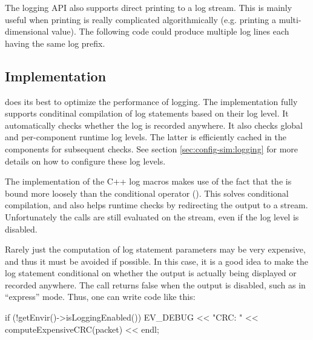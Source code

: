 The {\opp} logging API also supports direct printing to a log stream. This is
mainly useful when printing is really complicated algorithmically (e.g. printing
a multi-dimensional value). The following code could produce multiple log lines
each having the same log prefix.

\begin{cpp}
void Matrix::print(std::stream &output) { ... }
void Matrix::someFunction()
{
   print(EV_INFO);
\end{cpp}


\subsection{Implementation}
\label{sec:sim-lib:logging-implementation}

{\opp} does its best to optimize the performance of logging. The implementation
fully supports conditinal compilation of log statements based on their log
level. It automatically checks whether the log is recorded anywhere. It also
checks global and per-component runtime log levels. The latter is efficiently
cached in the components for subsequent checks. See section
\ref{sec:config-sim:logging} for more details on how to configure these log
levels.

The implementation of the C++ log macros makes use of the fact that the
 is bound more loosely than the conditional operator
(). This solves conditional compilation, and also helps runtime
checks by redirecting the output to a  stream. Unfortunately the
 calls are still evaluated on the  stream, even if
the log level is disabled.

Rarely just the computation of log statement parameters may be very expensive,
and thus it must be avoided if possible. In this case, it is a good idea to
make the log statement conditional on whether the output is actually being
displayed or recorded anywhere. The  call
returns false when the output is disabled, such as in ``express'' mode. Thus,
one can write code like this:


\begin{cpp}
if (!getEnvir()->isLoggingEnabled())
    EV_DEBUG << "CRC: " << computeExpensiveCRC(packet) << endl;
\end{cpp}




